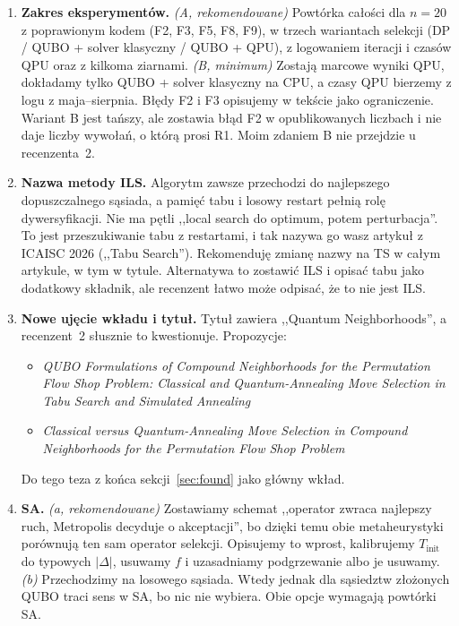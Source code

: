\documentclass[11pt,a4paper]{article}
\begin{document}
\begin{enumerate}[label=\textbf{D\arabic*.},leftmargin=2.2em]
\item \textbf{Zakres eksperymentów.}
  \emph{(A, rekomendowane)} Powtórka całości dla $n=20$ z poprawionym kodem (F2, F3, F5, F8, F9), w trzech wariantach selekcji (DP / QUBO + solver klasyczny / QUBO + QPU), z logowaniem iteracji i czasów QPU oraz z kilkoma ziarnami.
  \emph{(B, minimum)} Zostają marcowe wyniki QPU, dokładamy tylko QUBO + solver klasyczny na CPU, a czasy QPU bierzemy z logu z maja--sierpnia. Błędy F2 i F3 opisujemy w tekście jako ograniczenie.
  Wariant B jest tańszy, ale zostawia błąd F2 w opublikowanych liczbach i nie daje liczby wywołań, o którą prosi R1. Moim zdaniem B nie przejdzie u recenzenta~2.
\item \textbf{Nazwa metody ILS.} Algorytm zawsze przechodzi do najlepszego dopuszczalnego sąsiada, a pamięć tabu i losowy restart pełnią rolę dywersyfikacji. Nie ma pętli ,,local search do optimum, potem perturbacja''. To jest przeszukiwanie tabu z restartami, i tak nazywa go wasz artykuł z ICAISC 2026 (,,Tabu Search''). Rekomenduję zmianę nazwy na TS w całym artykule, w tym w tytule. Alternatywa to zostawić ILS i opisać tabu jako dodatkowy składnik, ale recenzent łatwo może odpisać, że to nie jest ILS.
\item \textbf{Nowe ujęcie wkładu i tytuł.} Tytuł zawiera ,,Quantum Neighborhoods'', a recenzent~2 słusznie to kwestionuje. Propozycje:
  \begin{itemize}
  \item \emph{QUBO Formulations of Compound Neighborhoods for the Permutation Flow Shop Problem: Classical and Quantum-Annealing Move Selection in Tabu Search and Simulated Annealing}
  \item \emph{Classical versus Quantum-Annealing Move Selection in Compound Neighborhoods for the Permutation Flow Shop Problem}
  \end{itemize}
  Do tego teza z końca sekcji~\ref{sec:found} jako główny wkład.
\item \textbf{SA.} \emph{(a, rekomendowane)} Zostawiamy schemat ,,operator zwraca najlepszy ruch, Metropolis decyduje o akceptacji'', bo dzięki temu obie metaheurystyki porównują ten sam operator selekcji. Opisujemy to wprost, kalibrujemy $T_{\text{init}}$ do typowych $|\Delta|$, usuwamy $f$ i uzasadniamy podgrzewanie albo je usuwamy. \emph{(b)} Przechodzimy na losowego sąsiada. Wtedy jednak dla sąsiedztw złożonych QUBO traci sens w SA, bo nic nie wybiera. Obie opcje wymagają powtórki SA.

\end{enumerate}
\end{document}
